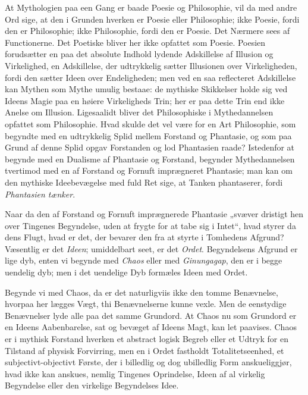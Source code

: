 \documentclass[12pt]{book}
\newcommand{\opage}[1]{\marginnote{\footnotesize\textit{[#1]}}}
\begin{document}
At Mythologien paa een Gang er baade Poesie og Philosophie,
vil da med andre Ord sige, at den i Grunden hverken
er Poesie eller Philosophie; ikke Poesie, fordi den er Philosophie;
ikke Philosophie, fordi den er Poesie. Det Nærmere sees
\opage{75}af Functionerne. Det Poetiske bliver her ikke opfattet som
Poesie. Poesien forudsætter en paa det absolute Indhold
lydende Adskillelse af Illusion og Virkelighed, en Adskillelse, der
udtrykkelig sætter Illusionen over Virkeligheden, fordi den
sætter Ideen over Endeligheden; men ved en saa reflecteret Adskillelse
kan Mythen som Mythe umulig bestaae: de mythiske
Skikkelser holde sig ved Ideens Magie paa en høiere Virkeligheds
Trin; her er paa dette Trin end ikke Anelse om Illusion.
Ligesaalidt bliver det Philosophiske i Mythedannelsen
opfattet som Philosophie. Hvad skulde det vel være for en
Art Philosophie, som begyndte med en udtrykkelig Splid mellem
Forstand og Phantasie, og som paa Grund af denne Splid
opgav Forstanden og lod Phantasien raade? Istedenfor at
begynde med en Dualisme af Phantasie og Forstand, begynder
Mythedannelsen tvertimod med en af Forstand og Fornuft
imprægneret Phantasie; man kan om den mythiske Ideebevægelse
med fuld Ret sige, at Tanken phantaserer, fordi
\emph{Phantasien tænker}.

Naar da den af Forstand og Fornuft imprægnerede
Phantasie „svæver dristigt hen over Tingenes Begyndelse,
uden at frygte for at tabe sig i Intet“, hvad styrer da dens
Flugt, hvad er det, der bevarer den fra at styrte i Tomhedens
Afgrund? Væsentlig er det \emph{Ideen}; umiddelbart seet, er det
\emph{Ordet}. Begyndelsens Afgrund er lige dyb, enten vi begynde
med \emph{Chaos} eller med \emph{Ginungagap}, den er i begge uendelig
dyb; men i det uendelige Dyb formæles Ideen med
Ordet.

Begynde vi med Chaos, da er det naturligviis ikke den
tomme Benævnelse, hvorpaa her lægges Vægt, thi Benævnelserne
kunne vexle. Men de eenstydige Benævnelser lyde
alle paa det samme Grundord. At Chaos nu som Grundord
er en Ideens Aabenbarelse, sat og bevæget af Ideens Magt,
kan let paavises. Chaos er i mythisk Forstand hverken et
abstract logisk Begreb eller et Udtryk for en Tilstand af physisk
\opage{76}Forvirring, men en i Ordet fastholdt Totalitetseenhed, et
subjectivt-objectivt Første, der i billedlig og dog ubilledlig
Form anskueliggjør, hvad ikke kan anskues, nemlig Tingenes
Oprindelse, Ideen af al virkelig Begyndelse eller den virkelige
Begyndelses Idee.
\end{document}
